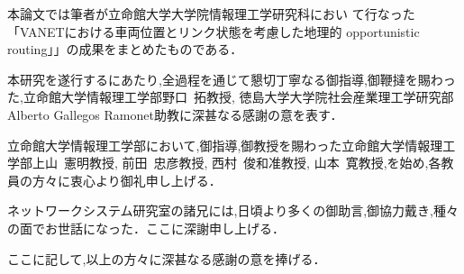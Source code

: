 \documentclass[10pt]{jreport}
\begin{document}
本論文では筆者が立命館大学大学院情報理工学研究科におい
て行なった「VANETにおける車両位置とリンク状態を考慮した地理的
opportunistic routing」」の成果をまとめたものである．

本研究を遂行するにあたり,全過程を通じて懇切丁寧なる御指導,御鞭撻を賜わっ
た,立命館大学情報理工学部野口~拓教授, 徳島大学大学院社会産業理工学研究部Alberto Gallegos Ramonet助教に深甚なる感謝の意を表す．

立命館大学情報理工学部において,御指導,御教授を賜わった立命館大学情報理工学部上山~憲明教授, 前田~忠彦教授, 西村~俊和准教授, 山本~寛教授,を始め,各教員の方々に衷心より御礼申し上げる．

ネットワークシステム研究室の諸兄には,日頃より多くの御助言,御協力戴き,種々の面でお世話になった．ここに深謝申し上げる．

ここに記して,以上の方々に深甚なる感謝の意を捧げる．





\end{document}
